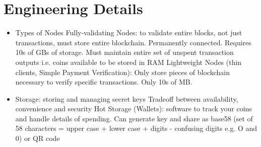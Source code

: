 \documentclass{article}
\begin{document}
\section*{Engineering Details}
\begin{itemize}
\item Types of Nodes
\subitem Fully-validating Nodes: to validate entire blocks, not just transactions, must store entire blockchain. Permanently connected. Requires 10s of GBs of storage. Must maintain entire set of unspent transaction outputs i.e. coins available to be stored in RAM
\subitem Lightweight Nodes (thin clients, Simple Payment Verification): Only store pieces of blockchain necessary to verify specific transactions. Only 10s of MB.
\item Storage: storing and managing secret keys
\subitem Tradeoff between availability, convenience and security
\subitem Hot Storage (Wallets): software to track your coins and handle details of spending. Can generate key and share as base58 (set of 58 characters = upper case + lower case + digits - confusing digits e.g. O and 0) or QR code
\end{itemize}
\end{document}
